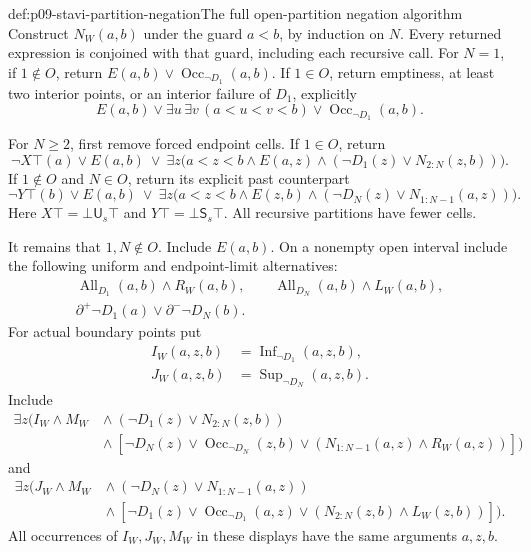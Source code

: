 \begin{hbdefinition}{def:p09-stavi-partition-negation}{The full open-partition negation algorithm}
Construct \(N_W(a,b)\) under the guard
\(a<b\), by induction on \(N\).
Every returned expression is conjoined with
that guard, including each recursive call.
For \(N=1\), if \(1\notin O\), return
\(E(a,b)\lor\operatorname{Occ}_{\neg D_1}(a,b)\).
If \(1\in O\), return emptiness, at
least two interior points, or an
interior failure of \(D_1\), explicitly
\[
 E(a,b)\lor\exists u\,\exists v\,(a<u<v<b)
                      \lor\operatorname{Occ}_{\neg D_1}(a,b).
\]

For \(N\geq2\), first remove forced
endpoint cells. If \(1\in O\), return
\[
 \neg X\top(a)\lor E(a,b)\ \lor\
 \exists z\bigl(a<z<b\land E(a,z)\land
                  (\neg D_1(z)\lor N_{2:N}(z,b))\bigr).
\]
If \(1\notin O\) and \(N\in O\),
return its explicit past counterpart
\[
 \neg Y\top(b)\lor E(a,b)\ \lor\
 \exists z\bigl(a<z<b\land E(z,b)\land
                  (\neg D_N(z)\lor N_{1:N-1}(a,z))\bigr).
\]
Here \(X\top=\bot\mathbin{\mathsf U_s}\top\)
and \(Y\top=\bot\mathbin{\mathsf S_s}\top\).
All recursive partitions have fewer cells.

It remains that \(1,N\notin O\).
Include \(E(a,b)\). On a nonempty
open interval include the following
uniform and endpoint-limit alternatives:
\[
\begin{gathered}
 \operatorname{All}_{D_1}(a,b)\land R_W(a,b),\qquad
 \operatorname{All}_{D_N}(a,b)\land L_W(a,b),\\
 \partial^+\neg D_1(a)\lor\partial^-\neg D_N(b).
\end{gathered}
\]
For actual boundary points put
\[
\begin{aligned}
 I_W(a,z,b)&=\operatorname{Inf}_{\neg D_1}(a,z,b),\\
 J_W(a,z,b)&=\operatorname{Sup}_{\neg D_N}(a,z,b).
\end{aligned}
\]
Include
\[
\begin{split}
 \exists z\bigl(I_W\land M_W
  &{}\land(\neg D_1(z)\lor N_{2:N}(z,b))\\
  &{}\land[
    \neg D_N(z)\lor\operatorname{Occ}_{\neg D_N}(z,b)
         \lor(N_{1:N-1}(a,z)\land R_W(a,z))]\bigr)
\end{split}
\]
and
\[
\begin{split}
 \exists z\bigl(J_W\land M_W
  &{}\land(\neg D_N(z)\lor N_{1:N-1}(a,z))\\
  &{}\land[
    \neg D_1(z)\lor\operatorname{Occ}_{\neg D_1}(a,z)
         \lor(N_{2:N}(z,b)\land L_W(z,b))]\bigr).
\end{split}
\]
All occurrences of \(I_W,J_W,M_W\)
in these displays have the same
arguments \(a,z,b\).


\end{hbdefinition}
